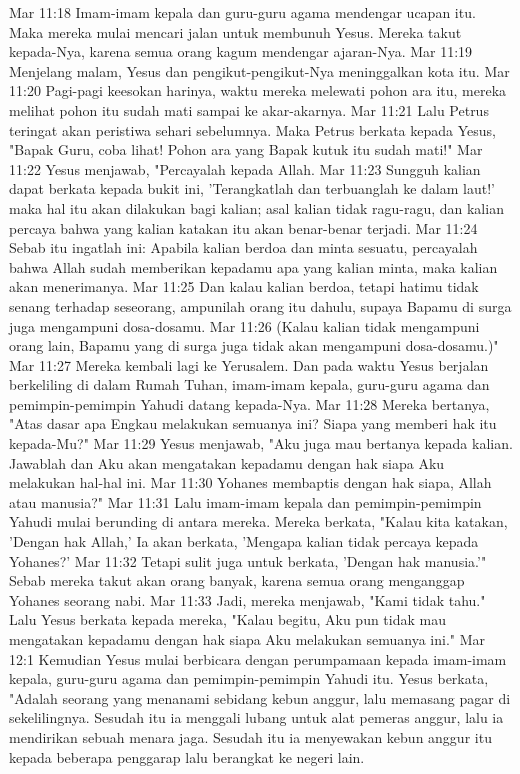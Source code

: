 Mar 11:18  Imam-imam kepala dan guru-guru agama mendengar ucapan itu. Maka mereka mulai mencari jalan untuk membunuh Yesus. Mereka takut kepada-Nya, karena semua orang kagum mendengar ajaran-Nya.
Mar 11:19  Menjelang malam, Yesus dan pengikut-pengikut-Nya meninggalkan kota itu.
Mar 11:20  Pagi-pagi keesokan harinya, waktu mereka melewati pohon ara itu, mereka melihat pohon itu sudah mati sampai ke akar-akarnya.
Mar 11:21  Lalu Petrus teringat akan peristiwa sehari sebelumnya. Maka Petrus berkata kepada Yesus, "Bapak Guru, coba lihat! Pohon ara yang Bapak kutuk itu sudah mati!"
Mar 11:22  Yesus menjawab, "Percayalah kepada Allah.
Mar 11:23  Sungguh kalian dapat berkata kepada bukit ini, 'Terangkatlah dan terbuanglah ke dalam laut!' maka hal itu akan dilakukan bagi kalian; asal kalian tidak ragu-ragu, dan kalian percaya bahwa yang kalian katakan itu akan benar-benar terjadi.
Mar 11:24  Sebab itu ingatlah ini: Apabila kalian berdoa dan minta sesuatu, percayalah bahwa Allah sudah memberikan kepadamu apa yang kalian minta, maka kalian akan menerimanya.
Mar 11:25  Dan kalau kalian berdoa, tetapi hatimu tidak senang terhadap seseorang, ampunilah orang itu dahulu, supaya Bapamu di surga juga mengampuni dosa-dosamu.
Mar 11:26  (Kalau kalian tidak mengampuni orang lain, Bapamu yang di surga juga tidak akan mengampuni dosa-dosamu.)"
Mar 11:27  Mereka kembali lagi ke Yerusalem. Dan pada waktu Yesus berjalan berkeliling di dalam Rumah Tuhan, imam-imam kepala, guru-guru agama dan pemimpin-pemimpin Yahudi datang kepada-Nya.
Mar 11:28  Mereka bertanya, "Atas dasar apa Engkau melakukan semuanya ini? Siapa yang memberi hak itu kepada-Mu?"
Mar 11:29  Yesus menjawab, "Aku juga mau bertanya kepada kalian. Jawablah dan Aku akan mengatakan kepadamu dengan hak siapa Aku melakukan hal-hal ini.
Mar 11:30  Yohanes membaptis dengan hak siapa, Allah atau manusia?"
Mar 11:31  Lalu imam-imam kepala dan pemimpin-pemimpin Yahudi mulai berunding di antara mereka. Mereka berkata, "Kalau kita katakan, 'Dengan hak Allah,' Ia akan berkata, 'Mengapa kalian tidak percaya kepada Yohanes?'
Mar 11:32  Tetapi sulit juga untuk berkata, 'Dengan hak manusia.'" Sebab mereka takut akan orang banyak, karena semua orang menganggap Yohanes seorang nabi.
Mar 11:33  Jadi, mereka menjawab, "Kami tidak tahu." Lalu Yesus berkata kepada mereka, "Kalau begitu, Aku pun tidak mau mengatakan kepadamu dengan hak siapa Aku melakukan semuanya ini."
Mar 12:1  Kemudian Yesus mulai berbicara dengan perumpamaan kepada imam-imam kepala, guru-guru agama dan pemimpin-pemimpin Yahudi itu. Yesus berkata, "Adalah seorang yang menanami sebidang kebun anggur, lalu memasang pagar di sekelilingnya. Sesudah itu ia menggali lubang untuk alat pemeras anggur, lalu ia mendirikan sebuah menara jaga. Sesudah itu ia menyewakan kebun anggur itu kepada beberapa penggarap lalu berangkat ke negeri lain.
